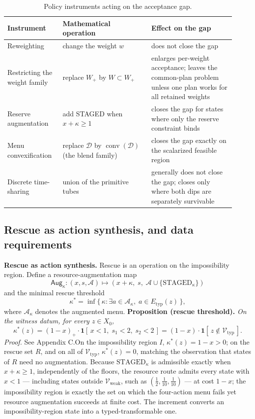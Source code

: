 \documentclass[review,11pt]{elsarticle}
\begin{document}
\begin{table}[htbp]
\centering
\small
\begin{tabular}{@{}p{0.22\linewidth}p{0.36\linewidth}p{0.34\linewidth}@{}}
\toprule
Instrument & Mathematical operation & Effect on the gap \\
\midrule
Reweighting & change the weight \(w\) & does not close the gap \\
Restricting the weight family & replace \(W_+\) by \(W \subset W_+\) & enlarges per-weight acceptance; leaves the common-plan problem unless one plan works for all retained weights \\
Reserve augmentation & add STAGED when \(x + \kappa \ge 1\) & closes the gap for states where only the reserve constraint binds \\
Menu convexification & replace \(\mathcal{D}\) by \(\operatorname{conv}(\mathcal{D})\) (the blend family) & closes the gap exactly on the scalarized feasible region \\
Discrete time-sharing & union of the primitive tubes & generally does not close the gap; closes only where both dips are separately survivable \\
\bottomrule
\end{tabular}
\caption{Policy instruments acting on the acceptance gap.}
\label{tab:instruments}
\end{table}

\subsection{Rescue as action synthesis, and data
requirements}\label{rescue-as-action-synthesis-and-data-requirements}

\textbf{Rescue as action synthesis.} Rescue is an operation on the impossibility region. Define a resource-augmentation map
\[\mathsf{Aug}_\kappa : (x, s, \mathcal{A}) \mapsto (x + \kappa,\; s,\; \mathcal{A} \cup \{\mathrm{STAGED}_\kappa\})\]
and the minimal rescue threshold
\[\kappa^* = \inf\{\, \kappa : \exists a \in \mathcal{A}_\kappa,\; a \in E_{\mathrm{typ}}(z) \,\},\]
where \(\mathcal{A}_\kappa\) denotes the augmented menu. \textbf{Proposition (rescue threshold).} \emph{On the witness datum, for every \(z \in X_0\),}
\[\kappa^*(z) = (1 - x)_+ \cdot \mathbf{1}[\,x < 1,\; s_1 < 2,\; s_2 < 2\,] = (1 - x) \cdot \mathbf{1}[\,z \notin \mathcal{V}_{\mathrm{typ}}\,].\]
\emph{Proof.} See Appendix C.On the impossibility region \(I\), \(\kappa^*(z) = 1 - x > 0\); on the rescue set \(R\), and on all of \(\mathcal{V}_{\mathrm{typ}}\), \(\kappa^*(z) = 0\), matching the observation that states of \(R\) need no augmentation. Because \(\mathrm{STAGED}_\kappa\) is admissible exactly when \(x + \kappa \ge 1\), independently of the floors, the resource route admits every state with \(x < 1\) --- including states outside \(\mathcal{V}_{\mathrm{weak}}\), such as \((\tfrac12, \tfrac1{10}, \tfrac1{10})\) --- at cost \(1 - x\); the impossibility region is exactly the set on which the four-action menu fails yet resource augmentation succeeds at finite cost. The increment converts an impossibility-region state into a typed-transformable one.
\end{document}
